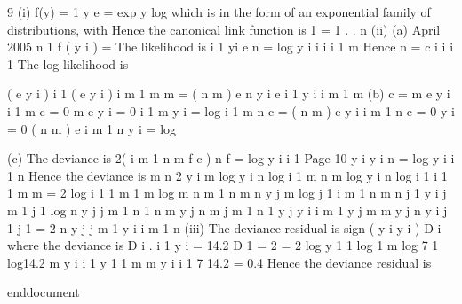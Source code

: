 \documentclass[a4paper,12pt]{article}
\begin{document}
9
(i)
f(y) =
1
y
e
= exp
y
log
which is in the form of an exponential family of distributions, with
Hence the canonical link function is
1
=
1
.
.
n
(ii)
(a)
April 2005
n
1
f ( y i ) =
The likelihood is
i 1
yi
e
n
=
log
y i
i
i
i 1
m
Hence
n
=
c
i
i
i 1
The log-likelihood is

(
e
y i )
i 1
(
e y i )
i m 1
m
m
=
( n m )
e
n
y i
e
i 1
y i
i m 1
m
(b)
c
= m e
y i
i 1
m
c
= 0
m e
y i = 0
i 1
m
y i
= log
i 1
m
n
c
= ( n m ) e
y i
i m 1
n
c
= 0
y i = 0
( n m ) e
i m 1
n
y i
= log

(c)
The deviance is 2(
i m 1
n m
f
c )
n
f
=
log y i
i 1
Page 10
y i
y i
n
=
log y i
i 1
n
Hence the deviance is
m
n
2
y i
m
log y i
n
log
i 1
m
n
m
log y i
n
log
i 1
i 1
1
m
m
= 2
log
i 1
1
m
1
m
log
m
n m
1
n m
n
y j
m
log
j 1
i m 1
n m
n
j 1
y i
j m 1
j 1
log
n
y j
j m 1
n
1
n m
y j
n m
j m 1
n
1
y j
y i
i m 1
y j
m
m
y j
n
y i
j 1
j 1
= 2
n
y j
j m 1
y i
i m 1
n
(iii)
The deviance residual is sign ( y i
y i ) D i where the deviance is
D i .
i 1
y i = 14.2
D 1 = 2
= 2
log y 1 1 log
1
m
log 7 1 log14.2
m
y i
i 1
y 1
1
m
m
y i
i 1
7
14.2
= 0.4
Hence the deviance residual is

end{document}
\end{document}
